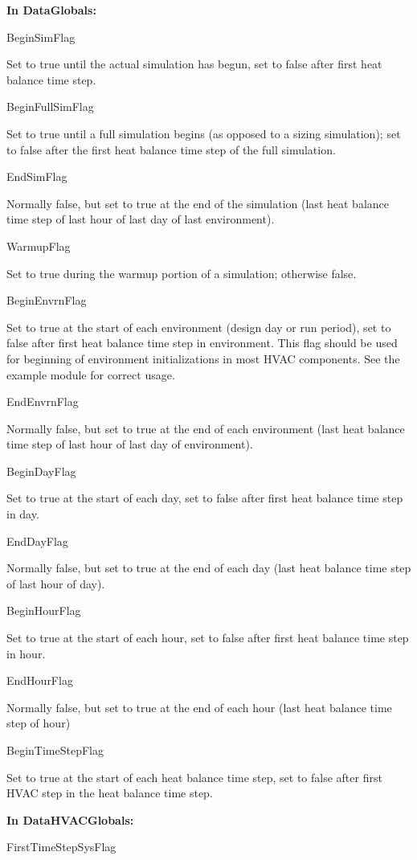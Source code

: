 \textbf{In DataGlobals:}

BeginSimFlag

Set to true until the actual simulation has begun, set to false after first heat balance time step.

BeginFullSimFlag

Set to true until a full simulation begins (as opposed to a sizing simulation); set to false after the first heat balance time step of the full simulation.

EndSimFlag

Normally false, but set to true at the end of the simulation (last heat balance time step of last hour of last day of last environment).

WarmupFlag

Set to true during the warmup portion of a simulation; otherwise false.

BeginEnvrnFlag

Set to true at the start of each environment (design day or run period), set to false after first heat balance time step in environment. This flag should be used for beginning of environment initializations in most HVAC components. See the example module for correct usage.

EndEnvrnFlag

Normally false, but set to true at the end of each environment (last heat balance time step of last hour of last day of environment).

BeginDayFlag

Set to true at the start of each day, set to false after first heat balance time step in day.

EndDayFlag

Normally false, but set to true at the end of each day (last heat balance time step of last hour of day).

BeginHourFlag

Set to true at the start of each hour, set to false after first heat balance time step in hour.

EndHourFlag

Normally false, but set to true at the end of each hour (last heat balance time step of hour)

BeginTimeStepFlag

Set to true at the start of each heat balance time step, set to false after first HVAC step in the heat balance time step.

\textbf{In DataHVACGlobals:}

FirstTimeStepSysFlag

